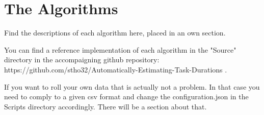 \newpage{}

\section{The Algorithms}

Find the descriptions of each algorithm here, placed in an own section. 

You can find a reference implementation of each algorithm in the "Source" directory in the accompaigning github repository: 
https://github.com/stho32/Automatically-Estimating-Task-Durations .

If you want to roll your own data that is actually not a problem.
In that case you need to comply to a given csv format and change the configuration.json in the Scripts directory accordingly. 
There will be a section about that. 


